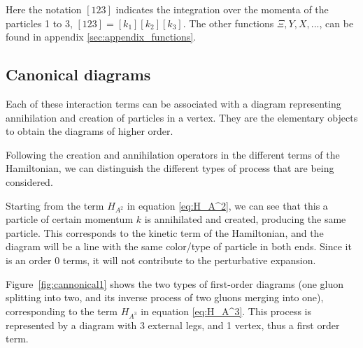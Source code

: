 \documentclass[11pt,a4paper,twoside,pdf]{article}
\numberwithin{equation}{section}
\begin{document}
Here the notation $[123]$ indicates the integration over the momenta of
the particles 1 to 3, $[123] = [k_1][k_2][k_3]$. The other functions $\Xi, Y, X, ...$,
can be found in appendix \ref{sec:appendix_functions}.


\subsection{Canonical diagrams}

Each of these interaction terms can be associated with a diagram representing 
annihilation and creation of particles in a vertex. They are the elementary 
objects to obtain the diagrams of higher order.

Following the creation and annihilation operators in the different terms of the 
Hamiltonian, we can distinguish the different types of process that are being
considered. 

Starting from the term $H_{A^2}$ in equation \eqref{eq:H_A^2}, we can see that this 
a particle of certain momentum $k$ is annihilated and created, producing the same
particle. This corresponds to the kinetic term of the Hamiltonian, and the diagram 
will be a line with the same color/type of particle in both ends. Since it is an 
order 0 terms, it will not contribute to the perturbative expansion.

Figure \ref{fig:cannonical1} shows the two types of first-order diagrams 
(one gluon splitting into two, and its inverse process of two gluons merging into one),
corresponding to the term $H_{A^3}$ in equation \eqref{eq:H_A^3}.
This process is represented by a diagram with 3 external legs, and 1 vertex, thus a 
first order term.
\end{document}
